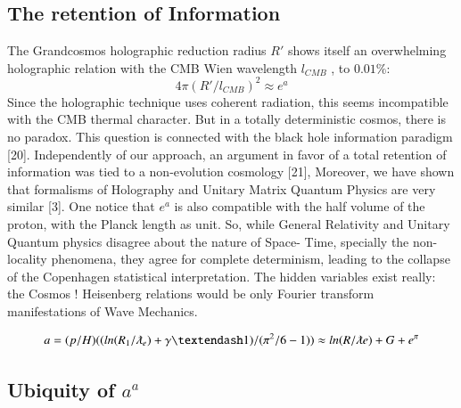 \documentclass[twoside,draft]{article}
\begin{document}
\begin{sloppypar}
{\subsection{The retention of Information}

The Grandcosmos holographic reduction radius $R\prime$ shows itself an overwhelming holographic
relation with the CMB Wien wavelength $l_{CMB}$ , to $0.01\%$:
$$4\pi(R\prime/l_{CMB})^{2} \approx e^{a}$$
Since the holographic technique uses coherent radiation, this seems incompatible with the CMB
thermal character. But in a totally deterministic cosmos, there is no paradox. This question is
connected with the black hole information paradigm [20]. Independently of our approach, an
argument in favor of a total retention of information was tied to a non-evolution cosmology
[21], Moreover, we have shown that formalisms of Holography and Unitary Matrix Quantum
Physics are very similar [3]. One notice that $e^{a}$ is also compatible with the half volume of the proton, with
the Planck length as unit.
So, while General Relativity and Unitary Quantum physics disagree about the nature of Space-
Time, specially the non-locality phenomena, they agree for complete determinism, leading to the collapse of the
Copenhagen statistical interpretation. The hidden variables exist really: the Cosmos ! Heisenberg
relations would be only Fourier transform manifestations of Wave Mechanics.

\begin{equation}
a = (p/H)((ln(R_1/\lambdabar_e) + \gamma – 1)/(\pi^2/6 - 1)) \approx ln(R/\lambdabar e) + G + e^{\pi}
\end{equation}

\subsection{Ubiquity of $a^{a}$}

}
\end{sloppypar}
\end{document}
